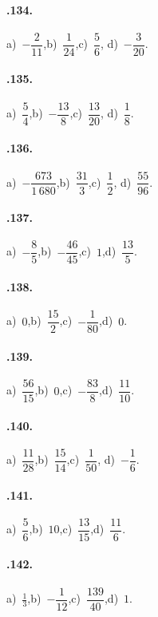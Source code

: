 \begin{multicols}{2}
\paragraph{\thechapter.134.}
a)~$-\dfrac{2}{11}$,\quad b)~$\dfrac{1}{24}$,\quad c)~$\dfrac{5}{6}$,%
\quad d)~$-\dfrac{3}{20}$.

\paragraph{\thechapter.135.}
a)~$\dfrac{5}{4}$,\quad b)~$-\dfrac{13}{8}$,\quad c)~$\dfrac{13}{20}$,%
\quad d)~$\dfrac{1}{8}$.

\paragraph{\thechapter.136.}
a)~$-\dfrac{673}{1\,680}$,\quad b)~$\dfrac{31}{3}$,\quad c)~$\dfrac{1}{2}$,%
\quad d)~$\dfrac{55}{96}$.

\paragraph{\thechapter.137.}
a)~$-\dfrac{8}{5}$,\quad b)~$-\dfrac{46}{45}$,\quad c)~$1$,\quad d)~$\dfrac{13}{5}$.

\paragraph{\thechapter.138.}
a)~$0$,\quad b)~$\dfrac{15}{2}$,\quad c)~$-\dfrac{1}{80}$,\quad d)~$0$.

\paragraph{\thechapter.139.}
a)~$\dfrac{56}{15}$,\quad b)~$0$,\quad c)~$-\dfrac{83}{8}$,\quad d)~$\dfrac{11}{10}$.

\paragraph{\thechapter.140.}
a)~$\dfrac{11}{28}$,\quad b)~$\dfrac{15}{14}$,\quad c)~$\dfrac{1}{50}$,\quad %
d)~$-\dfrac{1}{6}$.

\paragraph{\thechapter.141.}
a)~$\dfrac{5}{6}$,\quad b)~$10$,\quad c)~$\dfrac{13}{15}$,\quad d)~$\dfrac{11}{6}$.

\paragraph{\thechapter.142.}
a)~$\frac{1}{3}$,\quad b)~$-\dfrac{1}{12}$,\quad c)~$\dfrac{139}{40}$,\quad d)~$1$.


\end{multicols}
